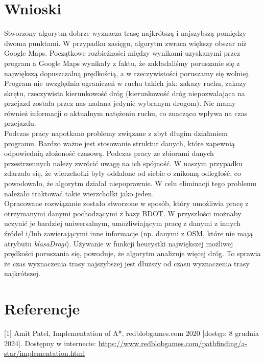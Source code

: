 \documentclass{article}
\begin{document}
\section{Wnioski}
Stworzony algorytm dobrze wyznacza trasę najkrótszą i najszybszą pomiędzy dwoma punktami. W przypadku zasięgu, algorytm zwraca większy obszar niż Google Maps.
Początkowe rozbieżności między wynikami uzyskanymi przez program a Google Maps wynikały z faktu, że zakładaliśmy poruszanie się z największą dopuszczalną prędkością, a w rzeczywistości poruszamy się wolniej.
Program nie uwzględnia ograniczeń w ruchu takich jak: zakazy ruchu, zakazy skrętu, rzeczywista kierunkowość dróg (kierunkowość dróg niepozwalająca na przejazd została przez 
nas nadana jedynie wybranym drogom). Nie mamy również informacji o aktualnym natężeniu ruchu, co znacząco wpływa na czas przejazdu.\\
Podczas pracy napotkano problemy związane z zbyt długim działaniem programu. Bardzo ważne jest stosowanie struktur danych, które zapewnią odpowiednią złożoność czasową. 
Podczas pracy ze zbiorami danych przestrzennych należy zwrócić uwagę na ich spójność. W naszym przypadku zdarzało się, że wierzchołki były oddalone od siebie o znikomą odległość, co powodowało, że algorytm działał niepoprawnie. W celu eliminacji tego problemu należało traktować takie wierzchołki jako jeden.\\
Opracowane rozwiązanie zostało stworzone w sposób, który umożliwia pracę z otrzymanymi danymi pochodzącymi z bazy BDOT. W przyszłości 
możnaby uczynić je bardziej uniwersalnym, umożliwiającym pracę z danymi z innych źródeł i/lub zawierającymi inne informacje (np. danymi z OSM,
które nie mają atrybutu \textit{klasaDrogi}). 
Używanie w funkcji heurystki największej możliwej prędkości poruszania się, powoduje, że algorytm analizuje więcej dróg. To sprawia że czas wyznaczenia trasy najszybszej jest dłuższy od czasu wyznaczenia trasy najkrótszej.

\section{Referencje}
[1] Amit Patel, Implementation of A*, redblobgames.com 2020 [dostęp: 8 grudnia 2024]. Dostępny w internecie: \url{https://www.redblobgames.com/pathfinding/a-star/implementation.html}
\end{document}

